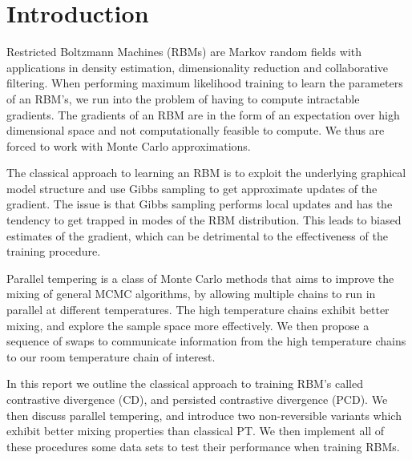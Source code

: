 \section{Introduction}
Restricted Boltzmann Machines (RBMs) are Markov random fields with applications in density estimation, dimensionality reduction and collaborative filtering. When performing maximum likelihood training to learn the parameters of an RBM's, we run into the problem of having to compute intractable gradients. The gradients of an RBM are in the form of an expectation over high dimensional space and not computationally feasible to compute. We thus are forced to work with Monte Carlo approximations. 

The classical approach to learning an RBM is to exploit the underlying graphical model structure and use Gibbs sampling to get approximate updates of the gradient. The issue is that Gibbs sampling performs local updates and has the tendency to get trapped in modes of the RBM distribution. This leads to biased estimates of the gradient, which can be detrimental to the effectiveness of the training procedure.

Parallel tempering is a class of Monte Carlo methods that aims to improve the mixing of general MCMC algorithms, by allowing multiple chains to run in parallel at different temperatures. The high temperature chains exhibit better mixing, and explore the sample space more effectively. We then propose a sequence of swaps to communicate information from the high temperature chains to our room temperature chain of interest. 

In this report we outline the classical approach to training RBM's called contrastive divergence (CD), and persisted contrastive divergence (PCD). We then discuss parallel tempering, and introduce two non-reversible variants which exhibit better mixing properties than classical PT. We then implement all of these procedures some data sets to test their performance when training RBMs.
